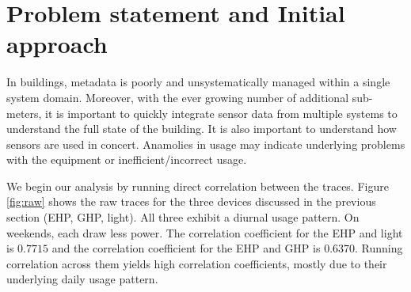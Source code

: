 


\section{Problem statement and Initial approach}\label{problem}

In buildings, metadata is poorly and unsystematically managed within a single system domain.  Moreover, 
with the ever growing number of additional sub-meters, it is important to quickly integrate
sensor data from multiple systems to understand the full state of the building.  It is also important to 
understand how sensors are used in concert.  Anamolies in usage may indicate underlying problems with 
the equipment or inefficient/incorrect usage.  

We begin our analysis by running direct correlation between the traces.
Figure \ref{fig:raw} shows the raw traces for the three devices discussed in 
the previous section (EHP, GHP, light).  All three exhibit a diurnal usage pattern.  On weekends, each
draw less power.  The correlation coefficient for 
 the EHP and light is $0.7715$ and the correlation coefficient for the EHP and GHP is $0.6370$.
Running correlation across them yields high correlation coefficients, mostly
due to their underlying daily usage pattern.


